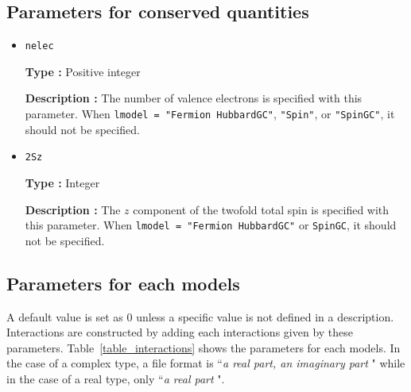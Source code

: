 \subsection{Parameters for conserved quantities}

\begin{itemize}
\item \verb|nelec|

{\bf Type :} Positive integer

{\bf Description :} The number of valence electrons is specified with this parameter.
When \verb|lmodel = "Fermion HubbardGC"|, \verb|"Spin"|, or  \verb|"SpinGC"|, 
it should not be specified.

\item \verb|2Sz|

{\bf Type :} Integer

{\bf Description :} The $z$ component of the twofold total spin is 
specified with this parameter.
When \verb|lmodel = "Fermion HubbardGC"| or \verb|SpinGC|,
it should not be specified. 
\end{itemize}


\subsection{Parameters for each models}
A default value is set as $0$ unless a specific value is not defined in a description. Interactions are constructed by adding each interactions given by these parameters. Table~\ref{table_interactions} shows the parameters for each models. In the case of a complex type, a file format is ``{\it a real part, an imaginary part} " while in the case of a real type, only ``{\it a real part} ".

